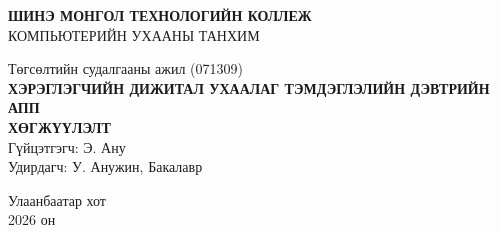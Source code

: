 \begin{titlepage}
  \centering
  \vspace*{1cm}

  {\large\bfseries ШИНЭ МОНГОЛ ТЕХНОЛОГИЙН КОЛЛЕЖ}\\[0.4cm]
  {\large КОМПЬЮТЕРИЙН УХААНЫ ТАНХИМ}

  \vfill

  {\normalsize Төгсөлтийн судалгааны ажил (071309)}\\[0.6cm]
  {\large\bfseries
    ХЭРЭГЛЭГЧИЙН ДИЖИТАЛ УХААЛАГ ТЭМДЭГЛЭЛИЙН ДЭВТРИЙН АПП\\[0.3cm]
    ХӨГЖҮҮЛЭЛТ
  }\\[0.8cm]
  {\normalsize Гүйцэтгэгч: Э. Ану}\\[0.3cm]
  {\normalsize Удирдагч: У. Анужин, Бакалавр}

  \vfill

  {\normalsize Улаанбаатар хот}\\[0.2cm]
  {\normalsize 2026 он}
\end{titlepage}
